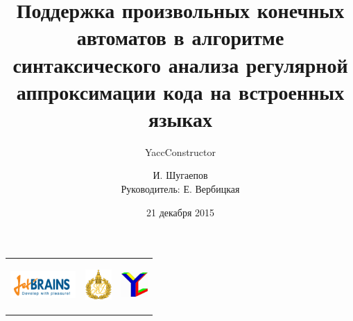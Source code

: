 \documentclass{beamer}
\title[]{Поддержка произвольных конечных автоматов в алгоритме синтаксического анализа регулярной аппроксимации кода на встроенных языках}
\subtitle[]{YaccConstructor}
\institute[]{
Лаборатория языковых инструментов JetBrains}
\author[И. Шугаепов]{И. Шугаепов \\ Руководитель: Е. Вербицкая}
\date{21 декабря 2015}
\begin{document}
{
\begin{frame}[fragile]
  \begin{tabular}{p{2.5cm} p{5.5cm} p{2cm}}
   \begin{center}
      \includegraphics[width=2.5cm]{pictures/JBLogoWhite.png}
    \end{center}
    &
    \begin{center}
      \includegraphics[width=1cm]{pictures/au.png}
    \end{center}
    &
    \begin{center}
      \includegraphics[width=1cm]{pictures/YC_big.jpg}
    \end{center} 
  \end{tabular}
  \titlepage
\end{frame}
}
            
\end{document}
